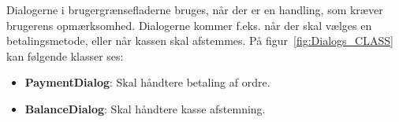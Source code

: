 
Dialogerne i brugergrænsefladerne bruges, når der er en handling, som kræver brugerens opmærksomhed. Dialogerne kommer f.eks. når der skal vælges en betalingsmetode, eller når kassen skal afstemmes. På figur~\ref{fig:Dialogs_CLASS} kan følgende klasser ses:
\begin{itemize}
	\item \textbf{PaymentDialog}: Skal håndtere betaling af ordre.
	\item \textbf{BalanceDialog}: Skal håndtere kasse afstemning.
\end{itemize}